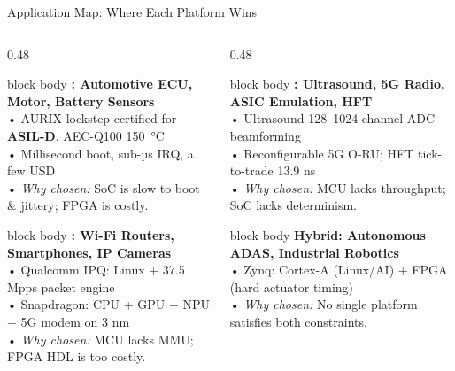 \begin{frame}{Application Map: Where Each Platform Wins}
\begin{columns}[T]
\begin{column}{0.48\linewidth}
\begin{beamercolorbox}[rounded=true,sep=4pt]{block body}\footnotesize
\textbf{\MCU: Automotive ECU, Motor, Battery Sensors}\\
• AURIX lockstep certified for \textbf{ASIL-D}, AEC-Q100 150~°C\\
• Millisecond boot, sub-µs IRQ, a few USD\\
• \emph{Why chosen:} SoC is slow to boot \& jittery; FPGA is costly.
\end{beamercolorbox}
\vspace{3pt}
\begin{beamercolorbox}[rounded=true,sep=4pt]{block body}\footnotesize
\textbf{\SoC: Wi-Fi Routers, Smartphones, IP Cameras}\\
• Qualcomm IPQ: Linux + 37.5 Mpps packet engine\\
• Snapdragon: CPU + GPU + NPU + 5G modem on 3 nm\\
• \emph{Why chosen:} MCU lacks MMU; FPGA HDL is too costly.
\end{beamercolorbox}
\end{column}
\begin{column}{0.48\linewidth}
\begin{beamercolorbox}[rounded=true,sep=4pt]{block body}\footnotesize
\textbf{\FPGA: Ultrasound, 5G Radio, ASIC Emulation, HFT}\\
• Ultrasound 128–1024 channel ADC beamforming\\
• Reconfigurable 5G O-RU; HFT tick-to-trade 13.9 ns\\
• \emph{Why chosen:} MCU lacks throughput; SoC lacks determinism.
\end{beamercolorbox}
\vspace{3pt}
\begin{beamercolorbox}[rounded=true,sep=4pt]{block body}\footnotesize
\textbf{Hybrid: Autonomous ADAS, Industrial Robotics}\\
• Zynq: Cortex-A (Linux/AI) + FPGA (hard actuator timing)\\
• \emph{Why chosen:} No single platform satisfies both constraints.
\end{beamercolorbox}
\end{column}
\end{columns}
\end{frame}

